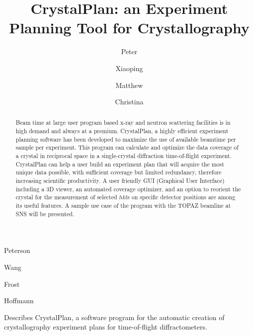 \documentclass[final]{iucr}              %
\begin{document}


\title{CrystalPlan: an Experiment Planning Tool for Crystallography}



\author[]{Peter}{Peterson}
\author[]{Xiaoping}{Wang}
\author[]{Matthew}{Frost}
\author[]{Christina}{Hoffmann}







\maketitle                        %

\begin{synopsis}
Describes CrystalPlan, a software program for the automatic creation of 
crystallography experiment plans for time-of-flight diffractometers.
\end{synopsis}

\begin{abstract}
Beam time at large user program based x-ray and neutron scattering facilities is
in high demand and always at a premium. CrystalPlan, a highly efficient
experiment planning software has been developed to maximize the use of available
beamtime per sample per experiment. 
This program can calculate and optimize the data coverage of a crystal in
reciprocal space in a single-crystal diffraction time-of-flight experiment.
CrystalPlan can help a user build an experiment plan that will acquire the most
unique data possible, with sufficient coverage but limited redundancy, therefore
increasing scientific productivity. 
A user friendly GUI (Graphical User Interface) including a 3D viewer, an
automated coverage optimizer, and an option to reorient the crystal for the measurement 
of selected $hkl$s on specific detector positions 
are among its useful features. 
A sample use case of the program with the TOPAZ beamline at SNS will be
presented. 
\end{abstract}
\end{document}

